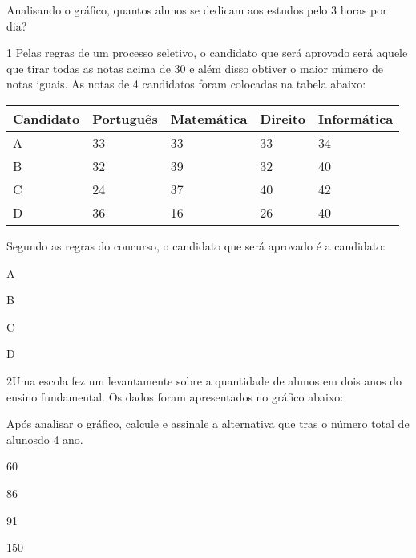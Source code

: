 
Analisando o gráfico, quantos alunos se dedicam aos estudos pelo 3 horas
por dia?




\num{1} Pelas regras de um processo seletivo, o candidato que será aprovado
será aquele que tirar todas as notas acima de 30 e além disso obtiver o
maior número de notas iguais. As notas de 4 candidatos foram colocadas
na tabela abaixo:

\begin{longtable}[]{@{}lllll@{}}
\toprule
Candidato & Português & Matemática & Direito &
Informática\tabularnewline
\midrule
\endhead
A & 33 & 33 & 33 & 34\tabularnewline
B & 32 & 39 & 32 & 40\tabularnewline
C & 24 & 37 & 40 & 42\tabularnewline
D & 36 & 16 & 26 & 40\tabularnewline
\bottomrule
\end{longtable}

Segundo as regras do concurso, o candidato que será aprovado é a
candidato:

\begin{escolha}
\item
  A
\item
  B
\item
  C
\item
  D
\end{escolha}


\num{2}Uma escola fez um levantamente sobre a quantidade de alunos em dois
anos do ensino fundamental. Os dados foram apresentados no gráfico
abaixo:


Após analisar o gráfico, calcule e assinale a alternativa que tras o
número total de alunosdo 4 ano.

\begin{escolha}
\item
  60
\item
  86
\item
  91
\item
  150
\end{escolha}

